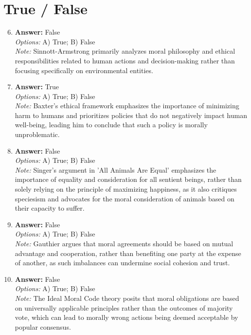 \documentclass[12pt]{article}
\begin{document}
\section*{True / False}
\begin{enumerate}[label=\arabic*.]
\setcounter{enumi}{5}
\item \textbf{Answer:} False
\\ \textit{Options:} A) True; B) False
\\ \textit{Note:} Sinnott-Armstrong primarily analyzes moral philosophy and ethical responsibilities related to human actions and decision-making rather than focusing specifically on environmental entities.
\item \textbf{Answer:} True
\\ \textit{Options:} A) True; B) False
\\ \textit{Note:} Baxter's ethical framework emphasizes the importance of minimizing harm to humans and prioritizes policies that do not negatively impact human well-being, leading him to conclude that such a policy is morally unproblematic.
\item \textbf{Answer:} False
\\ \textit{Options:} A) True; B) False
\\ \textit{Note:} Singer's argument in 'All Animals Are Equal' emphasizes the importance of equality and consideration for all sentient beings, rather than solely relying on the principle of maximizing happiness, as it also critiques speciesism and advocates for the moral consideration of animals based on their capacity to suffer.
\item \textbf{Answer:} False
\\ \textit{Options:} A) True; B) False
\\ \textit{Note:} Gauthier argues that moral agreements should be based on mutual advantage and cooperation, rather than benefiting one party at the expense of another, as such imbalances can undermine social cohesion and trust.
\item \textbf{Answer:} False
\\ \textit{Options:} A) True; B) False
\\ \textit{Note:} The Ideal Moral Code theory posits that moral obligations are based on universally applicable principles rather than the outcomes of majority vote, which can lead to morally wrong actions being deemed acceptable by popular consensus.
\end{enumerate}
\end{document}
